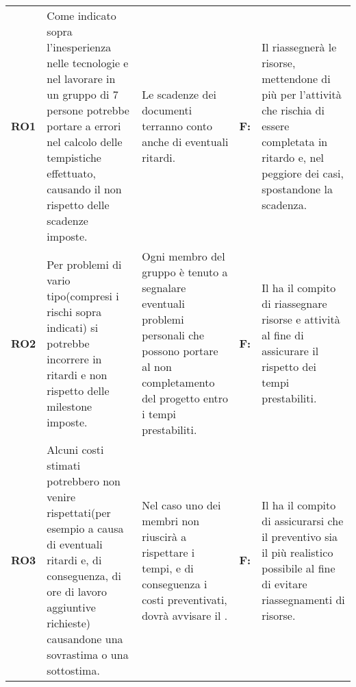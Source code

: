 {\begin{longtable}{C{2.5cm} C{3.25cm} C{3.25cm} C{1.5cm} C{3cm}}
\textbf{RO1} & 
Come indicato sopra l'inesperienza nelle tecnologie e nel lavorare in un gruppo di 7 persone potrebbe portare a errori nel calcolo delle tempistiche effettuato, causando il non rispetto delle scadenze imposte. & 
Le scadenze dei documenti terranno conto anche di eventuali ritardi. &
\textbf{F:}  &
Il \respProg{} riassegnerà le risorse, mettendone di più per l'attività che rischia di essere completata in ritardo e, nel peggiore dei casi, spostandone la scadenza. \\

\textbf{RO2} & 
Per problemi di vario tipo(compresi i rischi sopra indicati) si potrebbe incorrere in ritardi e non rispetto delle milestone imposte. & 
Ogni membro del gruppo è tenuto a segnalare eventuali problemi personali che possono portare al non completamento del progetto entro i tempi prestabiliti. &
\textbf{F:}  &
Il \respProg{}ha il compito di riassegnare risorse e attività al fine di assicurare il rispetto dei tempi prestabiliti. \\

\textbf{RO3} &
Alcuni costi stimati potrebbero non venire rispettati(per esempio a causa di eventuali ritardi e, di conseguenza, di ore di lavoro aggiuntive richieste) causandone una sovrastima o una sottostima. &
Nel caso uno dei membri non riuscirà a rispettare i tempi, e di conseguenza i costi preventivati, dovrà avvisare il \respProg{}. &
\textbf{F:}  &
Il \respProg{} ha il compito di assicurarsi che il preventivo sia il più realistico possibile al fine di evitare riassegnamenti di risorse. \\

\end{longtable}
}